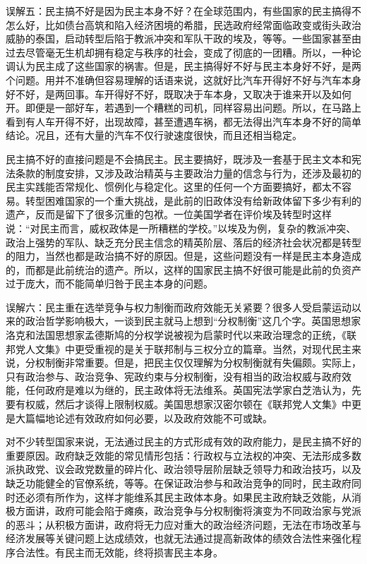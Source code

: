 误解五：民主搞不好是因为民主本身不好？在全球范围内，有些国家的民主搞得不怎么好，比如债台高筑和陷入经济困境的希腊，民选政府经常面临政变或街头政治威胁的泰国，启动转型后陷于教派冲突和军队干政的埃及，等等。一些国家甚至由过去尽管毫无生机却拥有稳定与秩序的社会，变成了彻底的一团糟。所以，一种论调认为民主成了这些国家的祸害。但是，民主搞得好不好与民主本身好不好，是两个问题。用并不准确但容易理解的话语来说，这就好比汽车开得好不好与汽车本身好不好，是两回事。车开得好不好，既取决于车本身，又取决于谁来开以及如何开。即便是一部好车，若遇到一个糟糕的司机，同样容易出问题。所以，在马路上看到有人车开得不好，出现故障，甚至遭遇车祸，都无法得出汽车本身不好的简单结论。况且，还有大量的汽车不仅行驶速度很快，而且还相当稳定。

民主搞不好的直接问题是不会搞民主。民主要搞好，既涉及一套基于民主文本和宪法条款的制度安排，又涉及政治精英与主要政治力量的信念与行为，还涉及最初的民主实践能否常规化、惯例化与稳定化。这里的任何一个方面要搞好，都太不容易。转型困难国家的一个重大挑战，是此前的旧政体没有给新政体留下多少有利的遗产，反而是留下了很多沉重的包袱。一位美国学者在评价埃及转型时这样说：“对民主而言，威权政体是一所糟糕的学校。”以埃及为例，复杂的教派冲突、政治上强势的军队、缺乏充分民主信念的精英阶层、落后的经济社会状况都是转型的阻力，当然也都是政治搞不好的原因。但是，这些问题没有一样是民主本身造成的，而都是此前统治的遗产。所以，这样的国家民主搞不好很可能是此前的负资产过于庞大，而不能简单归咎于民主本身的问题。

误解六：民主重在选举竞争与权力制衡而政府效能无关紧要？很多人受启蒙运动以来的政治哲学影响极大，一谈到民主就马上想到“分权制衡”这几个字。英国思想家洛克和法国思想家孟德斯鸠的分权学说被视为启蒙时代以来政治理念的正统，《联邦党人文集》中更受重视的是关于联邦制与三权分立的篇章。当然，对现代民主来说，分权制衡非常重要。但是，把民主仅仅理解为分权制衡就有失偏颇。实际上，只有政治参与、政治竞争、宪政约束与分权制衡，没有相当的政治权威与政府效能，任何政府是难以为继的，民主政体将无法维系。英国宪法学家白芝浩认为，先要有权威，然后才谈得上限制权威。美国思想家汉密尔顿在《联邦党人文集》中更是大篇幅地论述有效政府如何必要，以及政府效能不可或缺。

对不少转型国家来说，无法通过民主的方式形成有效的政府能力，是民主搞不好的重要原因。政府缺乏效能的常见情形包括：行政权与立法权的冲突、无法形成多数派执政党、议会政党数量的碎片化、政治领导层阶层缺乏领导力和政治技巧，以及缺乏功能健全的官僚系统，等等。在保证政治参与和政治竞争的同时，民主政府同时还必须有所作为，这样才能维系其民主政体本身。如果民主政府缺乏效能，从消极方面讲，政府可能会陷于瘫痪，政治竞争与分权制衡将演变为不同政治家与党派的恶斗；从积极方面讲，政府将无力应对重大的政治经济问题，无法在市场改革与经济发展等关键问题上达成绩效，也就无法通过提高新政体的绩效合法性来强化程序合法性。有民主而无效能，终将损害民主本身。

